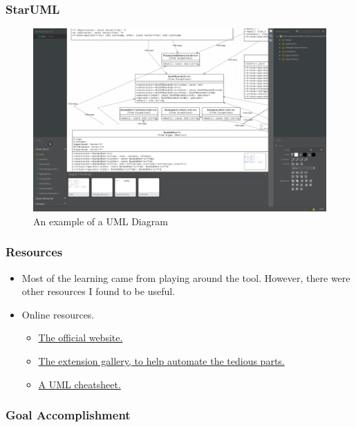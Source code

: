 \documentclass[xclolor=dvipsnames]{beamer}            %
\begin{document}
\begin{darkframes}
    \begin{frame}[fragile]
        \frametitle{StarUML}
        \begin{figure}[H]
            \centering
            \includegraphics[width=\linewidth]{assets/staruml.png}
            \caption{An example of a UML Diagram}
            \label{fig:staruml}
        \end{figure}
    \end{frame}

    \begin{frame}
        \frametitle{Resources}

        \begin{itemize}
            \item Most of the learning came from playing around the tool. However, there were other resources I found to be useful.

            \item Online resources.
                \begin{itemize}
                    \item \href{http://staruml.io}{The official website.}
                    \item \href{http://staruml.io/extensions}{The extension gallery, to help automate the tedious parts.}
                    \item \href{https://holub.com/uml/}{A UML cheatsheet.}
                \end{itemize}

        \end{itemize}
    \end{frame}

    \begin{frame}
        \frametitle{Goal Accomplishment}


\end{frame}
\end{darkframes}
\end{document}
